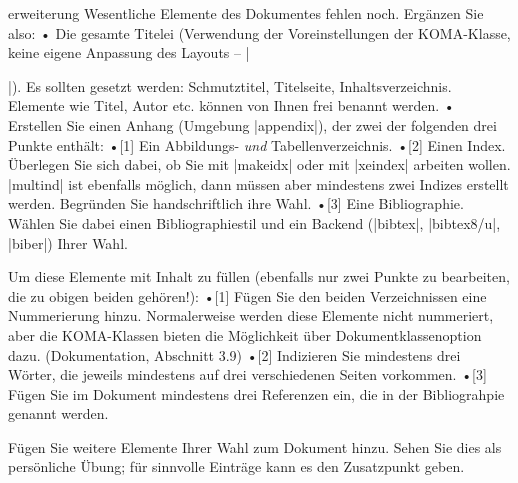 \documentclass[
	solution,
	blatt=9,
	ausgabe=12.\,06.\,2010,
	rückgabe=18.\,06.\,2010
]{lcourse-hd}
\begin{document}
\begin{exercise}[
  name={Erweiterung},
  punkte=6,
  abgabe = \begin{itemize}\item {Den gesamten Quellcode als Email (mehrere Dateien). Bitte überlegen Sie sich, falls möglich, eine Archivierung (zip o.\,ä.), um den Transfer zu erleichtern.}
\item Fertiges Dokument (pdf) per Mail.
\item {Ausdruck von Inhaltsverzeichnis, erster Textseite sowie Index bzw. Bibliographie. Also drei repräsentative Seiten Ihres Dokumentes.}
\item Handschriftliche Begründung für die Indexwahl.
\end{itemize}
]{erweiterung}
Wesentliche Elemente des Dokumentes fehlen noch. Ergänzen Sie also:
• Die gesamte Titelei (Verwendung der Voreinstellungen der KOMA-Klasse, keine eigene Anpassung des Layouts – |\maketitle|). Es sollten gesetzt werden: 
Schmutztitel, Titelseite, Inhaltsverzeichnis. Elemente wie Titel, Autor etc. können von Ihnen frei benannt werden.
• Erstellen Sie einen Anhang (Umgebung |appendix|), der zwei der folgenden drei Punkte enthält:
•[1] Ein Abbildungs- \emph{und} Tabellenverzeichnis.
•[2] Einen Index. Überlegen Sie sich dabei, ob Sie mit |makeidx| oder mit |xeindex| arbeiten wollen. |multind| ist ebenfalls möglich, dann müssen aber mindestens zwei Indizes erstellt werden. Begründen Sie handschriftlich ihre Wahl.
•[3] Eine Bibliographie. Wählen Sie dabei einen Bibliographiestil und ein Backend (|bibtex|, |bibtex8/u|, |biber|) Ihrer Wahl.

Um diese Elemente mit Inhalt zu füllen (ebenfalls nur zwei Punkte zu bearbeiten, die zu obigen beiden gehören!):
•[1] Fügen Sie den beiden Verzeichnissen eine Nummerierung hinzu. Normalerweise werden diese Elemente nicht nummeriert, aber die KOMA-Klassen bieten die Möglichkeit über Dokumentklassenoption dazu. (Dokumentation, Abschnitt 3.9)
•[2] Indizieren Sie mindestens drei Wörter, die jeweils mindestens auf drei verschiedenen Seiten vorkommen.
•[3] Fügen Sie im Dokument mindestens drei Referenzen ein, die in der Bibliograhpie genannt werden.


Fügen Sie weitere Elemente Ihrer Wahl zum Dokument hinzu. Sehen Sie dies als persönliche Übung; für sinnvolle Einträge kann es den Zusatzpunkt geben.
\end{exercise}
\end{document}
